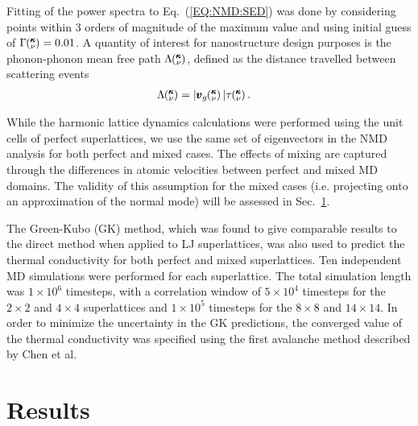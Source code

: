 \documentclass[aps,prb,preprint,preprintnumbers,amsmath,amssymb,floatfix,superscriptaddress]{revtex4}
\newcommand{\kv}{\mspace{-4.0mu}\left(\mspace{-8.0mu}
\begin{smallmatrix}&\pmb{\kappa} \\&\nu\end{smallmatrix}
\mspace{-3.0mu}\right)}
\begin{document}
Fitting of the power spectra to Eq.~(\ref{EQ:NMD:SED}) was done by considering points within 3 orders of magnitude of the maximum value and using initial guess of $\Gamma\kv=0.01$. A quantity of interest for nanostructure design purposes \cite{PhysRevB.87.035437} is the phonon-phonon mean free path $\Lambda\kv$, defined as the distance travelled between scattering events \cite{ziman_electrons_2001}
\begin{equation}\label{EQ:M:phonon_mfp}
\begin{split}
\Lambda\kv &= |\pmb{v}_{g}\kv {}| \tau\kv.
\end{split}
\end{equation}

While the harmonic lattice dynamics calculations were performed using the unit cells of perfect superlattices, we use the same set of eigenvectors in the NMD analysis for both perfect and mixed cases. The effects of mixing are captured through the differences in atomic velocities between perfect and mixed MD domains. The validity of this assumption for the mixed cases (i.e. projecting onto an approximation of the normal mode) will be assessed in Sec.~\ref{SEC:results}.

The Green-Kubo (GK) method, which was found to give comparable results to the direct method when applied to LJ superlattices,\cite {PhysRevB.79.075316} was also used to predict the thermal conductivity for both perfect and mixed superlattices. Ten independent MD simulations were performed for each superlattice. The total  simulation length was $1\times 10^6$ timesteps, with a correlation window of $5\times 10^4$ timesteps for the $2 \times 2$ and $4 \times 4$ superlattices and $1\times 10^5$ timesteps for the $8 \times 8$ and $14 \times 14$. In order to minimize the uncertainty in the GK predictions, the converged value of the thermal conductivity was specified using the first avalanche method described by Chen et al. \cite{Chen20102392}


\section{Results}\label{SEC:results}
\end{document}

